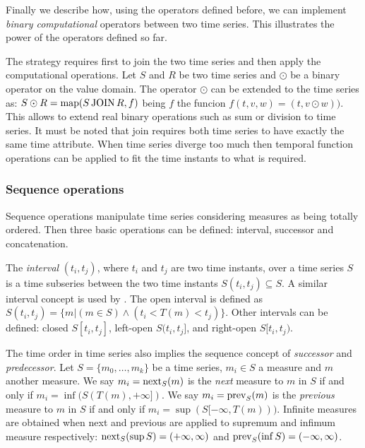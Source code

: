 
Finally we describe how, using the operators defined before, we can
implement \emph{binary computational} operators between two time
series. This illustrates the power of the operators defined so far.
%

The strategy requires first to join the two time series and then
apply the computational operations. 
%
Let $S$ and $R$ be two time series and $\odot$ be a binary operator on
the value domain. The operator $\odot$ can be extended to the time
series as:
%
$S\odot R=\operatorname*{map}(S\operatorname*{JOIN} R, f)$ being $f$ the funcion
$f(t,v,w)=(t,v\odot w))$.
%
This allows to extend real binary operations such as sum or division
to time series.  
It must be noted that join requires both time series
to have exactly the same time attribute. When time series diverge too
much then temporal function operations can be applied to fit the time
instants to what is required.





\subsubsection{Sequence operations}

Sequence operations manipulate time series considering measures as
being totally ordered. Then three basic operations can be defined:
interval, successor and concatenation.


The \emph{interval} $(t_i,t_j)$, where $t_i$ and $t_j$ are two time
instants, over a time series $S$ is a time subseries between the two
time instants $S(t_i,t_j) \subseteq S$. A similar interval concept
is used by \cite{last:hetland}. The open interval is defined as
$S(t_i,t_j)=\{m | (m\in S) \wedge (t_i<T(m)<t_j)\}$. Other intervals can be
defined: closed $S[t_i,t_j]$, left-open $S(t_i,t_j]$, and right-open
$S[t_i,t_j)$.

The time order in time series also implies the sequence concept of
\emph{successor} and \emph{predecessor}.  Let $S=\{m_0, \ldots, m_k\}$
be a time series, $m_i\in S$ a measure and $m$ another measure. We
say $m_i=\operatorname*{next}_S(m)$ is the \emph{next} measure to $m$ in $S$ if
and only if $m_i=\inf(S(T(m),+\infty])$.  We say $m_i=\operatorname*{prev}_S(m)$
is the \emph{previous} measure to $m$ in $S$ if and only if
$m_i=\sup(S[-\infty,T(m)))$. %
Infinite measures are obtained when next and previous are applied to
supremum and infimum measure respectively: $\operatorname*{next}_S(\sup
S)=(+\infty,\infty)$ and $\operatorname*{prev}_S(\inf S)=(-\infty,\infty)$.



